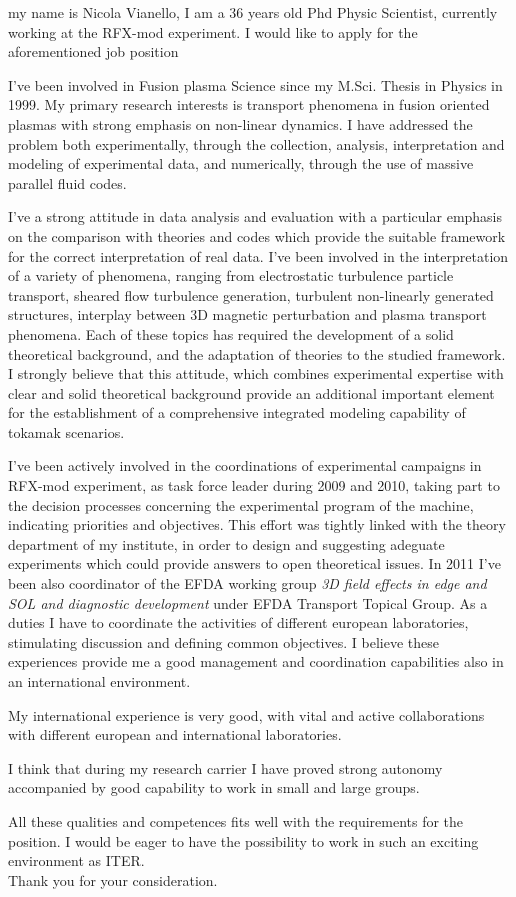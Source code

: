 \documentclass[12pt,stdletter,a4paper,dateno,sigleft]{newlfm}
\begin{document}
\begin{newlfm}
my name is Nicola Vianello, I am a 36 years old Phd Physic Scientist,
currently working at the RFX-mod experiment. I would like to apply for
the aforementioned job position

I've been involved in Fusion plasma Science since my M.Sci. Thesis in
Physics in 1999. My primary research interests is transport phenomena in fusion
oriented plasmas with strong emphasis on non-linear dynamics. I have
addressed the problem both experimentally, through the collection, 
analysis, interpretation and modeling of experimental data, and
numerically, through the use of massive parallel fluid codes. 

I've a strong attitude in
data analysis and evaluation with a particular emphasis on the
comparison with theories and codes which provide the suitable framework for the
correct interpretation of real data. I've been involved in
the interpretation of a variety of phenomena, ranging from electrostatic
turbulence particle transport, sheared flow turbulence generation,
turbulent non-linearly generated structures, interplay between 3D
magnetic perturbation and plasma transport phenomena. Each of these
topics has required the development of a solid theoretical
background, and the adaptation of theories to the studied framework. I strongly believe that this
attitude, which combines experimental expertise  with clear and solid
theoretical background provide an additional important element for the
establishment of a comprehensive integrated modeling capability of
tokamak scenarios. 

I've been actively involved in the coordinations of experimental
campaigns in RFX-mod experiment, as task force leader during 2009 and
2010, taking part to the decision processes concerning the
experimental program of the machine, indicating priorities and
objectives. This effort was tightly linked with the theory department
of my institute, in order to design and suggesting adeguate experiments
which could provide answers to open theoretical issues.
In 2011 I've been also coordinator of the 
EFDA working group \emph{3D field effects in
  edge and SOL and diagnostic development} under EFDA Transport
Topical Group. As a duties I have to coordinate the
activities of different  european laboratories, stimulating
discussion and defining common objectives. I believe these experiences
provide me a good management and coordination capabilities also in an
international environment. 

My international experience is very good, with vital and active
collaborations with different european and international laboratories. 

I think that during my research carrier I have proved strong autonomy
accompanied by good capability to work in small and large groups. 

All these qualities and competences fits well with the
requirements for the position. I would be eager to have the possibility to work in such an exciting environment as ITER.\\
Thank you for your consideration. 

\end{newlfm}
\end{document}
